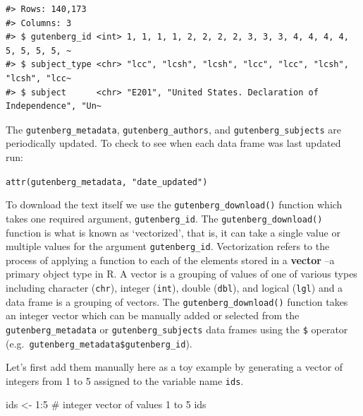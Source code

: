 \documentclass[
  letterpaper,
]{latex/krantz}
\newenvironment{Shaded}{\begin{snugshade}}{\end{snugshade}}
\newcommand{\CommentTok}[1]{\textcolor[rgb]{0.37,0.37,0.37}{#1}}
\newcommand{\DecValTok}[1]{\textcolor[rgb]{0.68,0.00,0.00}{#1}}
\newcommand{\NormalTok}[1]{\textcolor[rgb]{0.00,0.23,0.31}{#1}}
\newcommand{\OtherTok}[1]{\textcolor[rgb]{0.00,0.23,0.31}{#1}}
\newcommand{\SpecialCharTok}[1]{\textcolor[rgb]{0.37,0.37,0.37}{#1}}
\begin{document}
\begin{verbatim}
#> Rows: 140,173
#> Columns: 3
#> $ gutenberg_id <int> 1, 1, 1, 1, 2, 2, 2, 2, 3, 3, 3, 4, 4, 4, 4, 5, 5, 5, 5, ~
#> $ subject_type <chr> "lcc", "lcsh", "lcsh", "lcc", "lcc", "lcsh", "lcsh", "lcc~
#> $ subject      <chr> "E201", "United States. Declaration of Independence", "Un~
\end{verbatim}

\begin{tcolorbox}[enhanced jigsaw, opacitybacktitle=0.6, breakable, colframe=quarto-callout-warning-color-frame, arc=.35mm, left=2mm, leftrule=.75mm, title=\textcolor{quarto-callout-warning-color}{\faExclamationTriangle}\hspace{0.5em}{Tip}, opacityback=0, colback=white, toptitle=1mm, rightrule=.15mm, titlerule=0mm, bottomtitle=1mm, bottomrule=.15mm, coltitle=black, colbacktitle=quarto-callout-warning-color!10!white, toprule=.15mm]
The \texttt{gutenberg\_metadata}, \texttt{gutenberg\_authors}, and
\texttt{gutenberg\_subjects} are periodically updated. To check to see
when each data frame was last updated run:

\texttt{attr(gutenberg\_metadata,\ "date\_updated")}
\end{tcolorbox}

To download the text itself we use the \texttt{gutenberg\_download()}
function which takes one required argument, \texttt{gutenberg\_id}. The
\texttt{gutenberg\_download()} function is what is known as
`vectorized', that is, it can take a single value or multiple values for
the argument \texttt{gutenberg\_id}. Vectorization refers to the process
of applying a function to each of the elements stored in a
\textbf{vector} --a primary object type in R. A vector is a grouping of
values of one of various types including character (\texttt{chr}),
integer (\texttt{int}), double (\texttt{dbl}), and logical
(\texttt{lgl}) and a data frame is a grouping of vectors. The
\texttt{gutenberg\_download()} function takes an integer vector which
can be manually added or selected from the \texttt{gutenberg\_metadata}
or \texttt{gutenberg\_subjects} data frames using the \texttt{\$}
operator (e.g.~\texttt{gutenberg\_metadata\$gutenberg\_id}).

Let's first add them manually here as a toy example by generating a
vector of integers from 1 to 5 assigned to the variable name
\texttt{ids}.

\begin{Shaded}
\begin{Highlighting}[]
\NormalTok{ids }\OtherTok{\textless{}{-}} \DecValTok{1}\SpecialCharTok{:}\DecValTok{5} \CommentTok{\# integer vector of values 1 to 5}
\NormalTok{ids}
\end{Highlighting}
\end{Shaded}
\end{document}
